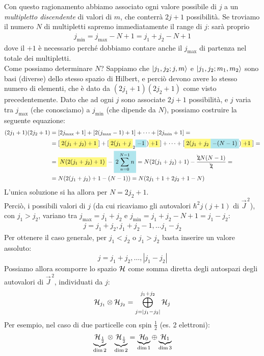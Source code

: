\documentclass[../../FisicaTeorica.tex]{subfiles}
\begin{document}
Con questo ragionamento abbiamo associato ogni valore possibile di $j$ a un \textit{multipletto discendente} di valori di $m$, che conterrà $2j+1$ possibilità. Se troviamo il numero $N$ di multipletti sapremo immediatamente il range di $j$: sarà proprio 
\begin{align*}
j_{\min} = j_{\max} - N + 1= j_1 + j_2 -N +1
\end{align*}
 dove il $+1$ è necessario perché dobbiamo contare anche il $j_{\max}$ di partenza nel totale dei multipletti.\\

Come possiamo determinare $N$? Sappiamo che $\Ket{j_1, j_2; j, m}$ e $\Ket{j_1, j_2; m_1, m_2}$ sono basi (diverse) dello stesso spazio di Hilbert, e perciò devono avere lo stesso numero di elementi, che è dato da $(2j_1 + 1)(2j_2 +1)$ come visto precedentemente. Dato che ad ogni $j$ sono associate $2j+1$ possibilità, e $j$ varia tra $j_{\max}$ (che conosciamo) a $j_{\min}$ (che dipende da $N$), possiamo costruire la seguente equazione:
\begin{align*}
(2j_1+1)(2j_2+1)&= [2j_{\max}+1] + [2(j_{\max}-1)+1] + \dots +[2j_{\min}+1]=\\
&=[\hlc{Yellow}{2(j_1+j_2)+1}]+[\hlc{Yellow}{2(j_1+j}_2\hlc{SkyBlue}{-1})\hlc{Yellow}{+1}]+ \dots + [\hlc{Yellow}{2(j_1+j_2}\hlc{SkyBlue}{-(N-1)})\hlc{Yellow}{+1}] =\\
&=\hlc{Yellow}{N(2(j_1+j_2)+1)}-\hlc{SkyBlue}{2 \sum_{n=0}^{N-1} n} = N(2(j_1 + j_2)+1) -\frac{\bcancel{2} N(N-1)}{\bcancel{2}} =\\
&=N(2(j_1+j_2)+ 1 - (N-1))=N(2j_1 + 1 + 2j_2 + 1 -N)
\end{align*}
L'unica soluzione si ha allora per $N=2j_2 +1$.\\
Perciò, i possibili valori di $j$ (da cui ricaviamo gli autovalori $\hbar^2 j(j+1)$ di $\vec{J}^{\,2}$), con $j_1 > j_2$, variano tra $j_{\max} = j_1 + j_2$ e $j_{\min} = j_1 + j_2 - N+1 = j_1-j_2$:
\begin{align*}
j =
j_1 + j_2, j_1 + j_2 -1, \dots j_1 - j_2
\end{align*}
Per ottenere il caso generale, per $j_1 < j_2$ o $j_1 > j_2$ basta inserire un valore assoluto:
\[
j = j_1 + j_2, \dots, |j_1-j_2|
\]
Possiamo allora scomporre lo spazio $\mathcal{H}$ come somma diretta degli autospazi degli autovalori di $\vec{J}^{\,2}$, individuati da $j$:
\[
\mathcal{H}_{j_1}\otimes \mathcal{H}_{j_2} = \bigoplus_{j=|j_1-j_2|}^{j_1+j_2} \mathcal{H}_j
\]
Per esempio, nel caso di due particelle con spin $\frac{1}{2}$ (es. 2 elettroni):
\[
\underbrace{\mathcal{H}_{\frac{1}{2}}}_{\operatorname{dim} 2}\otimes \underbrace{\mathcal{H}_{\frac{1}{2}}}_{\operatorname{dim}2} = \underbrace{\mathcal{H}_0}_{\operatorname{dim} 1} \oplus \underbrace{\mathcal{H}_1}_{\operatorname{dim}3}
\]
\end{document}
